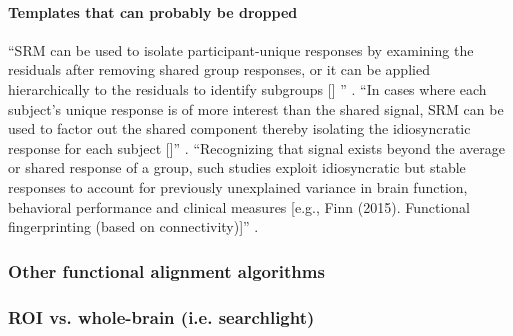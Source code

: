 \paragraph{Templates that can probably be dropped}
%
``SRM can be used to isolate participant-unique responses by examining the
residuals after removing shared group responses, or it can be applied
hierarchically to the residuals to identify subgroups [\citet{chen2017shared}]
'' \citep{cohen2017computational}.
%
``In cases where each subject's unique response is of more interest than the
shared signal, SRM can be used to factor out the shared component thereby
isolating the idiosyncratic response for each subject
[\citep{chen2015reduced}]'' \citep{kumar2020brainiak}.
%
``Recognizing that signal exists beyond the average or shared response of a
group, such studies exploit idiosyncratic but stable responses to account for
previously unexplained variance in brain function, behavioral performance and
clinical measures [e.g., Finn (2015). Functional fingerprinting (based on
connectivity)]'' \citep{cohen2017computational}.




\subsubsection{Other functional alignment algorithms}



\subsubsection{ROI vs. whole-brain (i.e. searchlight)}




